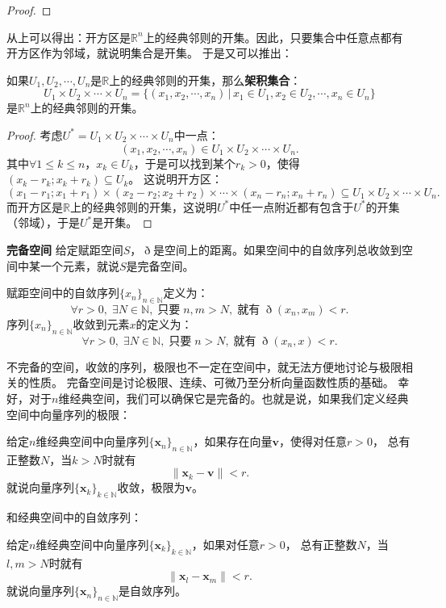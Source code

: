 \documentclass[12pt,UTF8,fontset=none]{ctexbook}
\begin{document}
\begin{appendix}
\begin{proof}
\end{proof}

从上可以得出：开方区是$\mathbb{R}^n$上的经典邻则的开集。因此，只要集合中任意点都有开方区作为邻域，就说明集合是开集。
于是又可以推出：

\begin{tm}\label{tm:b-1-20}
    如果$U_1,U_2,\cdots, U_n$是$\mathbb{R}$上的经典邻则的开集，那么\textbf{架积集合}：
    $$ U_1\times U_2\times \cdots \times U_n = \{(x_1, x_2, \cdots, x_n) \, | \, x_1\in U_1, x_2\in U_2, \cdots , x_n\in U_n\} $$
    是$\mathbb{R}^n$上的经典邻则的开集。
\end{tm}

\begin{proof}
    考虑$U^* = U_1\times U_2\times \cdots \times U_n$中一点：
    $$ (x_1, x_2, \cdots, x_n) \in U_1\times U_2\times \cdots \times U_n. $$
    其中$\forall 1\leqslant k\leqslant n$，$x_k\in U_k$，于是可以找到某个$r_k>0$，使得$(x_k-r_k;x_k+r_k)\subseteq U_k$。
    这说明开方区：
    $$ (x_1-r_1;x_1+r_1)\times(x_2-r_2;x_2+r_2)\times\cdots\times(x_n-r_n;x_n+r_n) \subseteq U_1\times U_2\times \cdots \times U_n. $$
    而开方区是$\mathbb{R}$上的经典邻则的开集，这说明$U^*$中任一点附近都有包含于$U^*$的开集（邻域），于是$U^*$是开集。

\end{proof}

\begin{df}{\textbf{完备空间}}
    给定赋距空间$S$，$\eth$是空间上的距离。如果空间中的自敛序列总收敛到空间中某一个元素，就说$S$是完备空间。

    赋距空间中的自敛序列$\{x_n\}_{n\in\mathbb{N}}$定义为：
    $$ \forall r > 0, \; \exists N\in\mathbb{N}, \; \mbox{只要}\;n,m> N, \;\mbox{就有}\; \eth(x_n, x_m) < r.$$
    序列$\{x_n\}_{n\in\mathbb{N}}$收敛到元素$x$的定义为：
    $$ \forall r > 0, \; \exists N\in\mathbb{N}, \; \mbox{只要}\;n> N, \;\mbox{就有}\; \eth(x_n, x) < r.$$
\end{df}

不完备的空间，收敛的序列，极限也不一定在空间中，就无法方便地讨论与极限相关的性质。
完备空间是讨论极限、连续、可微乃至分析向量函数性质的基础。
幸好，对于$n$维经典空间，我们可以确保它是完备的。也就是说，如果我们定义经典空间中向量序列的极限：
\begin{df}
    给定$n$维经典空间中向量序列$\{\mathbf{x}_n\}_{n\in\mathbb{N}}$，如果存在向量$\mathbf{v}$，使得对任意$r>0$，
    总有正整数$N$，当$k>N$时就有
    $$ \| \mathbf{x}_k - \mathbf{v}\| < r. $$
    就说向量序列$\{\mathbf{x}_k\}_{k\in\mathbb{N}}$收敛，极限为$\mathbf{v}$。
\end{df}
和经典空间中的自敛序列：
\begin{df}
    给定$n$维经典空间中向量序列$\{\mathbf{x}_k\}_{k\in\mathbb{N}}$，如果对任意$r>0$，
    总有正整数$N$，当$l, m>N$时就有
    $$ \| \mathbf{x}_l - \mathbf{x}_m\| < r. $$
    就说向量序列$\{\mathbf{x}_n\}_{n\in\mathbb{N}}$是自敛序列。
\end{df}


\end{appendix}
\end{document}
